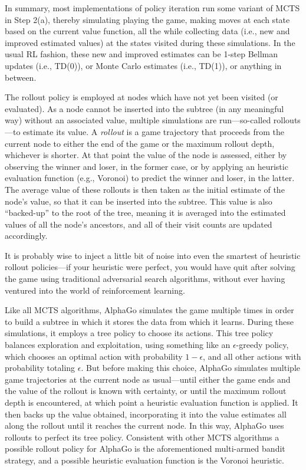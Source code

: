\documentclass{article}
\begin{document}
In summary, most implementations of policy iteration run some variant
of MCTS in Step 2(a), thereby simulating playing the game, making
moves at each state based on the current value function, all the while
collecting data (i.e., new and improved estimated values) at the
states visited during these simulations.  In the usual RL fashion,
these new and improved estimates can be 1-step Bellman updates (i.e.,
TD(0)),
or Monte Carlo estimates (i.e., TD(1)),
or anything in between.

The rollout policy is employed at nodes which have not yet been
visited (or evaluated).  As a node cannot be inserted into the subtree
(in any meaningful way) without an associated value, multiple
simulations are run---so-called rollouts---to estimate its value.  A
\emph{rollout\/} is a game trajectory that proceeds from the current
node to either the end of the game or the maximum rollout depth,
whichever is shorter.  At that point the value of the node is
assessed, either by observing the winner and loser, in the former
case, or by applying an heuristic evaluation function (e.g., Voronoi)
to predict the winner and loser, in the latter.  The average value of
these rollouts is then taken as the initial estimate of the node's
value, so that it can be inserted into the subtree.  This value is
also ``backed-up'' to the root of the tree, meaning it is averaged
into the estimated values of all the node's ancestors, and all of
their visit counts are updated accordingly.

It is probably wise to inject a little bit of noise into even the
smartest of heuristic rollout policies---if your heuristic were
perfect, you would have quit after solving the game using traditional
adversarial search algorithms, without ever having ventured into the
world of reinforcement learning.
\fi

Like all MCTS algorithms, AlphaGo simulates the game multiple times in
order to build a subtree in which it stores the data from which it
learns.  During these simulations, it employs a tree policy to choose
its actions.  This tree policy balances exploration and exploitation,
using something like an $\epsilon$-greedy policy, which chooses an
optimal action with probability $1-\epsilon$, and all other actions
with probability totaling $\epsilon$.
%
But before making this choice, AlphaGo simulates multiple game
trajectories at the current node as usual---until either the game ends
and the value of the rollout is known with certainty, or until the
maximum rollout depth is encountered, at which point a heuristic
evaluation function is applied.  It then backs up the value obtained,
incorporating it into the value estimates all along the rollout until
it reaches the current node.  In this way, AlphaGo uses rollouts to
perfect its tree policy.  Consistent with other MCTS algorithms a
possible rollout policy for AlphaGo is the aforementioned multi-armed
bandit strategy, and a possible heuristic evaluation function is the
Voronoi heuristic.
\fi
\end{document}
